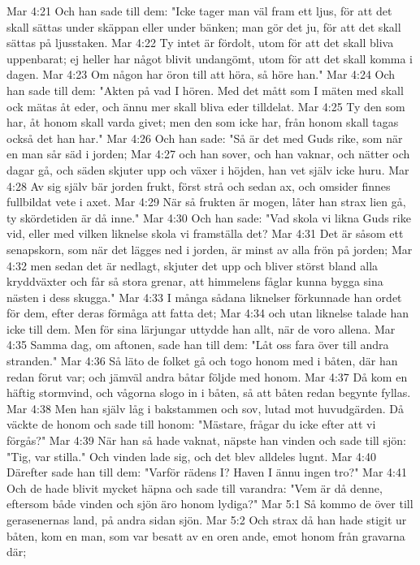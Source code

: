 Mar 4:21  Och han sade till dem: "Icke tager man väl fram ett ljus, för att det skall sättas under skäppan eller under bänken; man gör det ju, för att det skall sättas på ljusstaken.
Mar 4:22  Ty intet är fördolt, utom för att det skall bliva uppenbarat; ej heller har något blivit undangömt, utom för att det skall komma i dagen.
Mar 4:23  Om någon har öron till att höra, så höre han."
Mar 4:24  Och han sade till dem: "Akten på vad I hören. Med det mått som I mäten med skall ock mätas åt eder, och ännu mer skall bliva eder tilldelat.
Mar 4:25  Ty den som har, åt honom skall varda givet; men den som icke har, från honom skall tagas också det han har."
Mar 4:26  Och han sade: "Så är det med Guds rike, som när en man sår säd i jorden;
Mar 4:27  och han sover, och han vaknar, och nätter och dagar gå, och säden skjuter upp och växer i höjden, han vet själv icke huru.
Mar 4:28  Av sig själv bär jorden frukt, först strå och sedan ax, och omsider finnes fullbildat vete i axet.
Mar 4:29  När så frukten är mogen, låter han strax lien gå, ty skördetiden är då inne."
Mar 4:30  Och han sade: "Vad skola vi likna Guds rike vid, eller med vilken liknelse skola vi framställa det?
Mar 4:31  Det är såsom ett senapskorn, som när det lägges ned i jorden, är minst av alla frön på jorden;
Mar 4:32  men sedan det är nedlagt, skjuter det upp och bliver störst bland alla kryddväxter och får så stora grenar, att himmelens fåglar kunna bygga sina nästen i dess skugga."
Mar 4:33  I många sådana liknelser förkunnade han ordet för dem, efter deras förmåga att fatta det;
Mar 4:34  och utan liknelse talade han icke till dem. Men för sina lärjungar uttydde han allt, när de voro allena.
Mar 4:35  Samma dag, om aftonen, sade han till dem: "Låt oss fara över till andra stranden."
Mar 4:36  Så läto de folket gå och togo honom med i båten, där han redan förut var; och jämväl andra båtar följde med honom.
Mar 4:37  Då kom en häftig stormvind, och vågorna slogo in i båten, så att båten redan begynte fyllas.
Mar 4:38  Men han själv låg i bakstammen och sov, lutad mot huvudgärden. Då väckte de honom och sade till honom: "Mästare, frågar du icke efter att vi förgås?"
Mar 4:39  När han så hade vaknat, näpste han vinden och sade till sjön: "Tig, var stilla." Och vinden lade sig, och det blev alldeles lugnt.
Mar 4:40  Därefter sade han till dem: "Varför rädens I? Haven I ännu ingen tro?"
Mar 4:41  Och de hade blivit mycket häpna och sade till varandra: "Vem är då denne, eftersom både vinden och sjön äro honom lydiga?"
Mar 5:1  Så kommo de över till gerasenernas land, på andra sidan sjön.
Mar 5:2  Och strax då han hade stigit ur båten, kom en man, som var besatt av en oren ande, emot honom från gravarna där;
